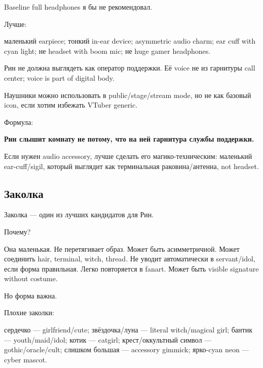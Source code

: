 Baseline full headphones я бы не рекомендовал.

Лучше:

маленький earpiece; тонкий in-ear device; asymmetric audio charm; ear
cuff with cyan light; не headset with boom mic; не huge gamer
headphones.

Рин не должна выглядеть как оператор поддержки. Её voice не из гарнитуры
call center; voice is part of digital body.

Наушники можно использовать в public/\hspace{0pt}stage/\hspace{0pt}stream mode, но не как
базовый icon, если хотим избежать VTuber generic.

Формула:

\textbf{Рин слышит комнату не потому, что на ней гарнитура службы
поддержки.}

Если нужен audio accessory, лучше сделать его магико-техническим:
маленький ear-cuff/\hspace{0pt}sigil, который выглядит как терминальная
раковина/\hspace{0pt}антенна, not headset.

\subsection*{Заколка}

Заколка --- один из лучших кандидатов для Рин.

Почему?

Она маленькая. Не перетягивает образ. Может быть асимметричной. Может
соединить hair, terminal, witch, thread. Не уводит автоматически в
servant/\hspace{0pt}idol, если форма правильная. Легко повторяется в fanart. Может
быть visible signature without costume.

Но форма важна.

Плохие заколки:

сердечко --- girlfriend/\hspace{0pt}cute; звёздочка/\hspace{0pt}луна --- literal witch/\hspace{0pt}magical
girl; бантик --- youth/\hspace{0pt}maid/\hspace{0pt}idol; котик --- catgirl; крест/\hspace{0pt}оккультный
символ --- gothic/\hspace{0pt}oracle/\hspace{0pt}cult; слишком большая --- accessory gimmick;
ярко-cyan neon --- cyber mascot.

